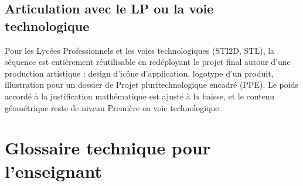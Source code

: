 \documentclass[12pt,a4paper]{scrartcl}
\begin{document}
\subsection{Articulation avec le LP ou la voie technologique}

Pour les Lycées Professionnels et les voies technologiques (STI2D, STL), la séquence est entièrement réutilisable en redéployant le projet final autour d'une production artistique : design d'icône d'application, logotype d'un produit, illustration pour un dossier de Projet pluritechnologique encadré (PPE). Le poids accordé à la justification mathématique est ajusté à la baisse, et le contenu géométrique reste de niveau Première en voie technologique.

\newpage
\section{Glossaire technique pour l'enseignant}\label{ap:glos}
\end{document}

